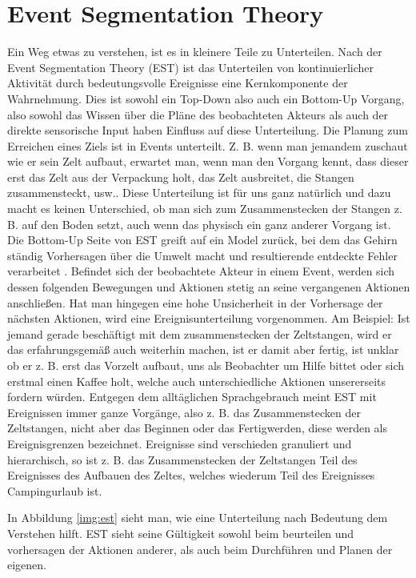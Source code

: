 \section{Event Segmentation Theory}
Ein Weg etwas zu verstehen, ist es in kleinere Teile zu Unterteilen. Nach der Event Segmentation Theory (EST) \cite{bib:est1} ist das Unterteilen von kontinuierlicher Aktivität durch bedeutungsvolle Ereignisse eine Kernkomponente der Wahrnehmung.  Dies ist sowohl ein Top-Down also auch ein Bottom-Up Vorgang, also sowohl das Wissen über die Pläne des beobachteten Akteurs als auch der direkte sensorische Input haben Einfluss auf diese Unterteilung.\cite{bib:est} Die Planung zum Erreichen eines Ziels ist in Events unterteilt. Z. B. wenn man jemandem zuschaut wie er sein Zelt aufbaut, erwartet man, wenn man den Vorgang kennt, dass dieser erst das Zelt aus der Verpackung holt, das Zelt ausbreitet, die Stangen zusammensteckt, usw.. Diese Unterteilung ist für uns ganz natürlich und dazu macht es keinen Unterschied, ob man sich zum Zusammenstecken der Stangen z. B. auf den Boden setzt, auch wenn das physisch ein ganz anderer Vorgang ist. Die Bottom-Up Seite von EST greift auf ein Model zurück, bei dem das Gehirn ständig Vorhersagen über die Umwelt macht und resultierende entdeckte Fehler verarbeitet \cite{bib:est}. Befindet sich der beobachtete Akteur in einem Event, werden sich dessen folgenden Bewegungen und Aktionen stetig an seine vergangenen Aktionen anschließen. Hat man hingegen eine hohe Unsicherheit in der Vorhersage der nächsten Aktionen, wird eine Ereignisunterteilung vorgenommen. Am Beispiel: Ist jemand gerade beschäftigt mit dem zusammenstecken der Zeltstangen, wird er das erfahrungsgemäß auch weiterhin machen, ist er damit aber fertig, ist unklar ob er z. B. erst das Vorzelt aufbaut, uns als Beobachter um Hilfe bittet oder sich erstmal einen Kaffee holt, welche auch unterschiedliche Aktionen unsererseits fordern würden.
Entgegen dem alltäglichen Sprachgebrauch meint EST mit Ereignissen immer ganze Vorgänge, also z. B. das Zusammenstecken der Zeltstangen, nicht aber das Beginnen oder das Fertigwerden, diese werden als Ereignisgrenzen bezeichnet. Ereignisse sind verschieden granuliert und hierarchisch, so ist z. B. das Zusammenstecken der Zeltstangen Teil des Ereignisses des Aufbauen des Zeltes, welches wiederum Teil des Ereignisses Campingurlaub ist.

In Abbildung \ref{img:est} sieht man, wie eine Unterteilung nach Bedeutung dem Verstehen hilft. EST sieht seine Gültigkeit sowohl beim beurteilen und vorhersagen der Aktionen anderer, als auch beim Durchführen und Planen der eigenen.



